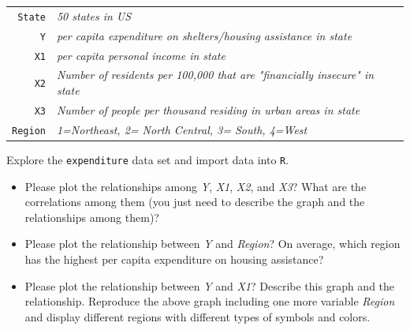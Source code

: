 \documentclass[12pt,letterpaper]{article}
\begin{document}
\begin{tabular}{r|l}
	\texttt{State} &\emph{50 states in US} \\
	\texttt{Y} & \emph{per capita expenditure on shelters/housing assistance in state}\\
	\texttt{X1} &\emph{per capita personal income in state} \\
	\texttt{X2} &  \emph{Number of residents per 100,000 that are "financially insecure" in state}\\
	\texttt{X3} &  \emph{Number of people per thousand residing in urban areas in state} \\
	\texttt{Region} &  \emph{1=Northeast, 2= North Central, 3= South, 4=West} \\
\end{tabular}

\vspace{.5cm}
\noindent Explore the \texttt{expenditure} data set and import data into \texttt{R}.
\vspace{.5cm}
  
\vspace{.5cm}
\begin{itemize}

\item
Please plot the relationships among \emph{Y}, \emph{X1}, \emph{X2}, and \emph{X3}? What are the correlations among them (you just need to describe the graph and the relationships among them)?
\item
Please plot the relationship between \emph{Y} and \emph{Region}? On average, which region has the highest per capita expenditure on housing assistance?
\item
\vspace{.5cm}
Please plot the relationship between \emph{Y} and \emph{X1}? Describe this graph and the relationship. Reproduce the above graph including one more variable \emph{Region} and display different regions with different types of symbols and colors.

\end{itemize}
\end{document}
